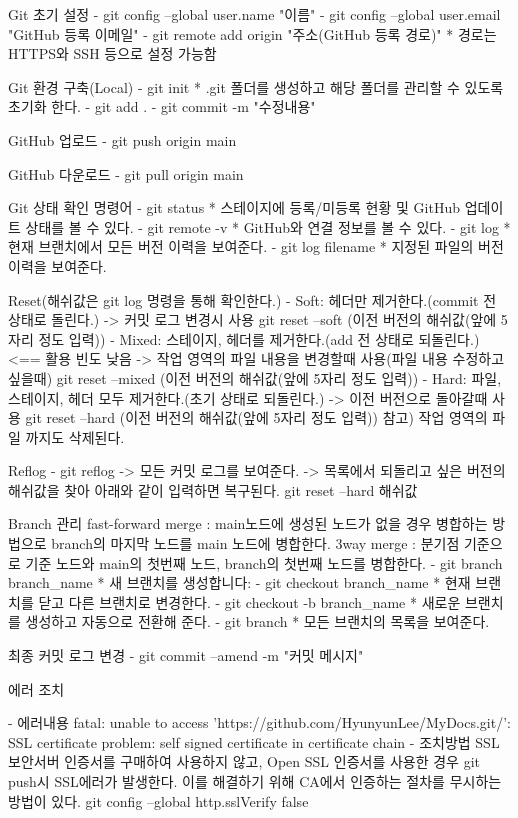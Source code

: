 
Git 초기 설정
  - git config --global user.name "이름"
  - git config --global user.email "GitHub 등록 이메일"
  - git remote add origin "주소(GitHub 등록 경로)"
    * 경로는 HTTPS와 SSH 등으로 설정 가능함

Git 환경 구축(Local)
  - git init 
    * .git 폴더를 생성하고 해당 폴더를 관리할 수 있도록 초기화 한다.
  - git add .
  - git commit -m "수정내용"

GitHub 업로드
  - git push origin main

GitHub 다운로드
  - git pull origin main

Git 상태 확인 명령어
  - git status
    * 스테이지에 등록/미등록 현황 및 GitHub 업데이트 상태를 볼 수 있다.
  - git remote -v 
    * GitHub와 연결 정보를 볼 수 있다.
  - git log
    * 현재 브랜치에서 모든 버전 이력을 보여준다.
  - git log filename
    * 지정된 파일의 버전 이력을 보여준다.

Reset(해쉬값은 git log 명령을 통해 확인한다.)
  - Soft: 헤더만 제거한다.(commit 전 상태로 돌린다.)
    -> 커밋 로그 변경시 사용
    git reset --soft (이전 버전의 해쉬값(앞에 5자리 정도 입력))
  - Mixed: 스테이지, 헤더를 제거한다.(add 전 상태로 되돌린다.)   <== 활용 빈도 낮음
    -> 작업 영역의 파일 내용을 변경할때 사용(파일 내용 수정하고 싶을때)
    git reset --mixed (이전 버전의 해쉬값(앞에 5자리 정도 입력))
  - Hard: 파일, 스테이지, 헤더 모두 제거한다.(초기 상태로 되돌린다.)
    -> 이전 버전으로 돌아갈때 사용
    git reset --hard (이전 버전의 해쉬값(앞에 5자리 정도 입력))
    참고) 작업 영역의 파일 까지도 삭제된다.

Reflog
  - git reflog
    -> 모든 커밋 로그를 보여준다.
    -> 목록에서 되돌리고 싶은 버전의 해쉬값을 찾아 아래와 같이 입력하면 복구된다.
       git reset --hard 해쉬값

Branch 관리
fast-forward merge : main노드에 생성된 노드가 없을 경우 병합하는 방법으로 branch의 마지막 노드를 main 노드에 병합한다.
3way merge : 분기점 기준으로 기준 노드와 main의 첫번째 노드, branch의 첫번째 노드를 병합한다.
  - git branch branch_name
    * 새 브랜치를 생성합니다:
  - git checkout branch_name
    * 현재 브랜치를 닫고 다른 브랜치로 변경한다.
  - git checkout -b branch_name
    * 새로운 브랜치를 생성하고 자동으로 전환해 준다.
  - git branch
    * 모든 브랜치의 목록을 보여준다.

최종 커밋 로그 변경
  - git commit --amend -m "커밋 메시지"

에러 조치

- 에러내용 
   fatal: unable to access 'https://github.com/HyunyunLee/MyDocs.git/': SSL certificate problem: self signed certificate in certificate chain
- 조치방법
   SSL 보안서버 인증서를 구매하여 사용하지 않고, Open SSL 인증서를 사용한 경우 git push시 SSL에러가 발생한다.
   이를 해결하기 위해 CA에서 인증하는 절차를 무시하는 방법이 있다.
   git config --global http.sslVerify false
